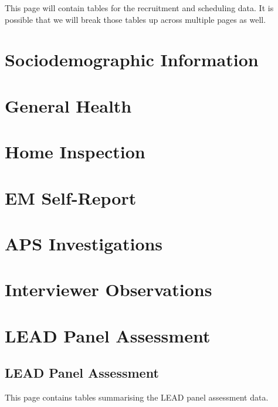 \documentclass[
  letterpaper,
  DIV=11,
  numbers=noendperiod]{scrreprt}
\begin{document}
This page will contain tables for the recruitment and scheduling data.
It is possible that we will break those tables up across multiple pages
as well.

\part{Sociodemographic Information}

\part{General Health}

\part{Home Inspection}

\part{EM Self-Report}

\part{APS Investigations}

\part{Interviewer Observations}

\part{LEAD Panel Assessment}

\hypertarget{lead-panel-assessment-1}{%
\chapter{LEAD Panel Assessment}\label{lead-panel-assessment-1}}

This page contains tables summarising the LEAD panel assessment data.
\end{document}
